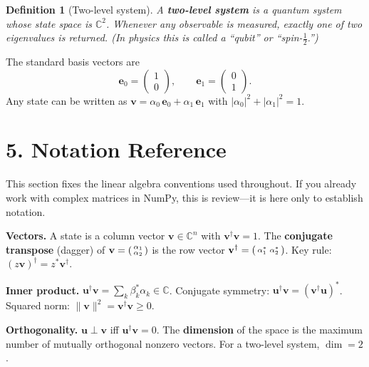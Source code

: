 \documentclass[12pt,a4paper]{article}
\newtheorem{definition}{Definition}
\begin{document}
\begin{definition}[Two-level system]
A \textbf{two-level system} is a quantum system whose state space is $\mathbb{C}^2$.  Whenever any observable is measured, exactly one of two eigenvalues is returned.  (In physics this is called a ``qubit'' or ``spin-$\tfrac{1}{2}$.'')
\end{definition}

\noindent The standard basis vectors are
\[
    \mathbf{e}_0 = \begin{pmatrix}1\\0\end{pmatrix}, \qquad
    \mathbf{e}_1 = \begin{pmatrix}0\\1\end{pmatrix}.
\]
Any state can be written as $\mathbf{v} = \alpha_0\,\mathbf{e}_0 + \alpha_1\,\mathbf{e}_1$ with $|\alpha_0|^2 + |\alpha_1|^2 = 1$.

\section{5. Notation Reference}

This section fixes the linear algebra conventions used throughout.  If you already work with complex matrices in NumPy, this is review---it is here only to establish notation.

\medskip
\noindent\textbf{Vectors.}  A state is a column vector $\mathbf{v} \in \mathbb{C}^n$ with $\mathbf{v}^\dagger\mathbf{v} = 1$.  The \textbf{conjugate transpose} (dagger) of $\mathbf{v} = \begin{psmallmatrix}\alpha_1\\\alpha_2\end{psmallmatrix}$ is the row vector $\mathbf{v}^\dagger = \begin{psmallmatrix}\alpha_1^*&\alpha_2^*\end{psmallmatrix}$.  Key rule: $(z\mathbf{v})^\dagger = z^*\mathbf{v}^\dagger$.

\medskip
\noindent\textbf{Inner product.}  $\mathbf{u}^\dagger\mathbf{v} = \sum_k \beta_k^*\alpha_k \in \mathbb{C}$.  Conjugate symmetry: $\mathbf{u}^\dagger\mathbf{v} = (\mathbf{v}^\dagger\mathbf{u})^*$.  Squared norm: $\|\mathbf{v}\|^2 = \mathbf{v}^\dagger\mathbf{v} \geq 0$.

\medskip
\noindent\textbf{Orthogonality.}  $\mathbf{u} \perp \mathbf{v}$ iff $\mathbf{u}^\dagger\mathbf{v} = 0$.  The \textbf{dimension} of the space is the maximum number of mutually orthogonal nonzero vectors.  For a two-level system, $\dim = 2$.
\end{document}

